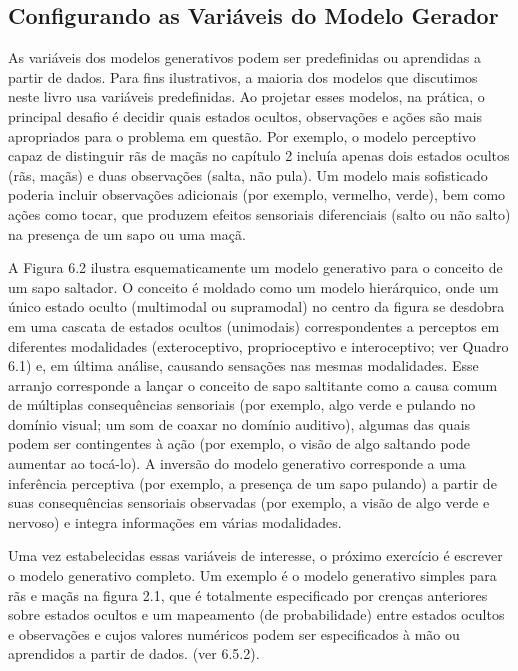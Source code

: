 \documentclass[
  12pt,
]{book}
\begin{document}
\hypertarget{configurando-as-variuxe1veis-do-modelo-gerador}{%
\subsection{Configurando as Variáveis do Modelo Gerador}\label{configurando-as-variuxe1veis-do-modelo-gerador}}

As variáveis dos modelos generativos podem ser predefinidas ou aprendidas a partir de dados. Para fins ilustrativos, a maioria dos modelos que discutimos neste livro usa variáveis predefinidas. Ao projetar esses modelos, na prática, o principal desafio é decidir quais estados ocultos, observações e ações são mais apropriados para o problema em questão. Por exemplo, o modelo perceptivo capaz de distinguir rãs de maçãs no capítulo 2 incluía apenas dois estados ocultos (rãs, maçãs) e duas observações (salta, não pula). Um modelo mais sofisticado poderia incluir observações adicionais (por exemplo, vermelho, verde), bem como ações como tocar, que produzem efeitos sensoriais diferenciais (salto ou não salto) na presença de um sapo ou uma maçã.

A Figura 6.2 ilustra esquematicamente um modelo generativo para o conceito de um sapo saltador. O conceito é moldado como um modelo hierárquico, onde um único estado oculto (multimodal ou supramodal) no centro da figura se desdobra em uma cascata de estados ocultos (unimodais) correspondentes a perceptos em diferentes modalidades (exteroceptivo, proprioceptivo e interoceptivo; ver Quadro 6.1) e, em última análise, causando sensações nas mesmas modalidades. Esse arranjo corresponde a lançar o conceito de sapo saltitante como a causa comum de múltiplas consequências sensoriais (por exemplo, algo verde e pulando no domínio visual; um som de coaxar no domínio auditivo), algumas das quais podem ser contingentes à ação (por exemplo, o visão de algo saltando pode aumentar ao tocá-lo). A inversão do modelo generativo corresponde a uma inferência perceptiva (por exemplo, a presença de um sapo pulando) a partir de suas consequências sensoriais observadas (por exemplo, a visão de algo verde e nervoso) e integra informações em várias modalidades.

Uma vez estabelecidas essas variáveis de interesse, o próximo exercício é escrever o modelo generativo completo. Um exemplo é o modelo generativo simples para rãs e maçãs na figura 2.1, que é totalmente especificado por crenças anteriores sobre estados ocultos e um mapeamento (de probabilidade) entre estados ocultos e observações e cujos valores numéricos podem ser especificados à mão ou aprendidos a partir de dados. (ver 6.5.2).
\end{document}
